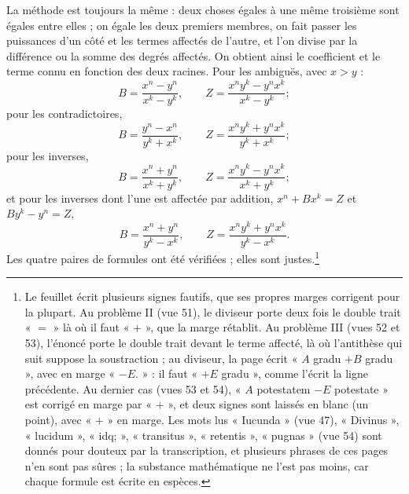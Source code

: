 \documentclass[11pt,a4paper]{article}
\begin{document}
La méthode est toujours la même : deux choses égales à une même troisième sont
égales entre elles ; on égale les deux premiers membres, on fait passer les
puissances d'un côté et les termes affectés de l'autre, et l'on divise par la
différence ou la somme des degrés affectés. On obtient ainsi le coefficient et
le terme connu en fonction des deux racines. Pour les ambiguës, avec $x > y$ :
\[ B = \frac{x^n - y^n}{x^k - y^k}, \qquad
   Z = \frac{x^n y^k - y^n x^k}{x^k - y^k} ; \]
pour les contradictoires,
\[ B = \frac{y^n - x^n}{y^k + x^k}, \qquad
   Z = \frac{x^n y^k + y^n x^k}{y^k + x^k} ; \]
pour les inverses,
\[ B = \frac{x^n + y^n}{x^k + y^k}, \qquad
   Z = \frac{x^n y^k - y^n x^k}{x^k + y^k} ; \]
et pour les inverses dont l'une est affectée par addition,
$x^n + Bx^k = Z$ et $By^k - y^n = Z$,
\[ B = \frac{x^n + y^n}{y^k - x^k}, \qquad
   Z = \frac{x^n y^k + y^n x^k}{y^k - x^k} . \]
Les quatre paires de formules ont été vérifiées ; elles sont justes.\footnote{Le
feuillet écrit plusieurs signes fautifs, que ses propres marges corrigent pour
la plupart. Au problème II (vue 51), le diviseur porte deux fois le double trait
« $=$ » là où il faut « $+$ », que la marge rétablit. Au problème III (vues 52 et
53), l'énoncé porte le double trait devant le terme affecté, là où l'antithèse
qui suit suppose la soustraction ; au diviseur, la page écrit « $A$ gradu $+ B$
gradu », avec en marge « $- E.$ » : il faut « $+ E$ gradu », comme l'écrit la
ligne précédente. Au dernier cas (vues 53 et 54), « $A$ potestatem $- E$ potestate »
est corrigé en marge par « $+$ », et deux signes sont laissés en blanc (un point),
avec « $+$ » en marge. Les mots lus « Iucunda » (vue 47), « Divinus »,
« lucidum », « idq; », « transitus », « retentis », « pugnas » (vue 54) sont
donnés pour douteux par la transcription, et plusieurs phrases de ces pages
n'en sont pas sûres ; la substance mathématique ne l'est pas moins, car chaque
formule est écrite en espèces.}
\end{document}
